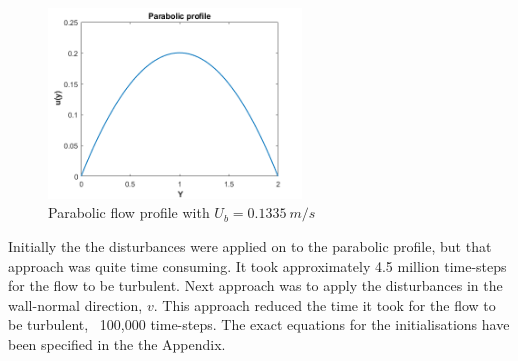 \begin{figure}[h]
    \centering
    \includegraphics[width=0.6\textwidth]{figur/Parabolic_profile.png}
    \caption{Parabolic flow profile with $U_b = 0.1335\ m/s$}
    \label{para profile}
\end{figure}
Initially the the disturbances were applied on to the parabolic profile, but that approach was quite time consuming. It took approximately 4.5 million time-steps for the flow to be turbulent. Next approach was to apply the disturbances in the wall-normal direction, $v$. This approach reduced the time it took for the flow to be turbulent, ~100,000 time-steps. The exact equations for the initialisations have been specified in the the Appendix.


